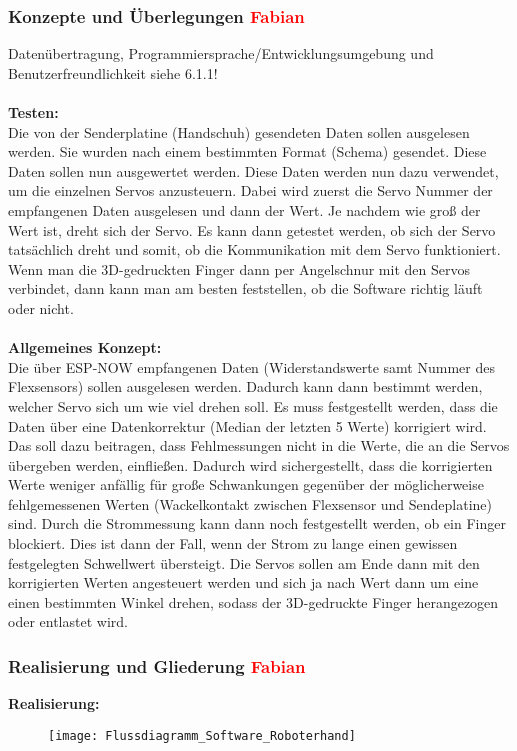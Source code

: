 \documentclass[11pt]{article}
\begin{document}
\subsubsection{Konzepte und Überlegungen \textcolor{red}{Fabian}}
Datenübertragung, Programmiersprache/Entwicklungsumgebung und Benutzerfreundlichkeit siehe 6.1.1! \\
\\
\textbf{Testen:}
\\
Die von der Senderplatine (Handschuh) gesendeten Daten sollen ausgelesen werden. Sie wurden nach einem bestimmten Format 
(Schema) gesendet. Diese Daten sollen nun ausgewertet werden. Diese Daten werden nun dazu verwendet, um die einzelnen Servos 
anzusteuern. Dabei wird zuerst die Servo Nummer der empfangenen Daten ausgelesen und dann der Wert. Je nachdem wie groß der
Wert ist, dreht sich der Servo. Es kann dann getestet werden, ob sich der Servo tatsächlich dreht und somit, ob die 
Kommunikation mit dem Servo funktioniert. Wenn man die 3D-gedruckten Finger dann per Angelschnur mit den Servos verbindet, 
dann kann man am besten feststellen, ob die Software richtig läuft oder nicht. \\
\\
\textbf{Allgemeines Konzept:}
\\
Die über ESP-NOW empfangenen Daten (Widerstandswerte samt Nummer des Flexsensors) sollen ausgelesen werden. Dadurch kann dann 
bestimmt werden, welcher Servo sich um wie viel drehen soll. Es muss festgestellt werden, dass die Daten über eine 
Datenkorrektur (Median der letzten 5 Werte) korrigiert wird. Das soll dazu beitragen, dass Fehlmessungen nicht in die Werte, 
die an die Servos übergeben werden, einfließen. Dadurch wird sichergestellt, dass die korrigierten Werte weniger anfällig für 
große Schwankungen gegenüber der möglicherweise fehlgemessenen Werten (Wackelkontakt zwischen Flexsensor und Sendeplatine) sind. 
Durch die Strommessung kann dann noch festgestellt werden, ob ein Finger blockiert. Dies ist dann der Fall, wenn der Strom zu 
lange einen gewissen festgelegten Schwellwert übersteigt. Die Servos sollen am Ende dann mit den korrigierten Werten angesteuert 
werden und sich ja nach Wert dann um eine einen bestimmten Winkel drehen, sodass der 3D-gedruckte Finger herangezogen oder
entlastet wird.
\\

\subsubsection{Realisierung und Gliederung \textcolor{red}{Fabian}}
\textbf{Realisierung:}
\\
\begin{figure}[H]
	\begin{center}
		\scalebox{0.5}
		{\texttt{[image: Flussdiagramm\_Software\_Roboterhand]}}
	\end{center}
\end{figure}
\end{document}
